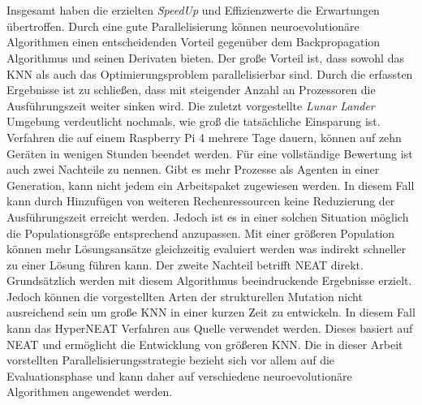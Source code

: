 \\\\
Insgesamt haben die erzielten \emph{SpeedUp} und Effizienzwerte die Erwartungen übertroffen. Durch eine gute Parallelisierung können neuroevolutionäre Algorithmen einen entscheidenden Vorteil gegenüber dem Backpropagation Algorithmus und seinen Derivaten bieten. Der große Vorteil ist, dass sowohl das \ac{KNN} als auch das Optimierungsproblem parallelisierbar sind. Durch die erfassten Ergebnisse ist zu schließen, dass mit steigender Anzahl an Prozessoren die Ausführungszeit weiter sinken wird. Die zuletzt vorgestellte \emph{Lunar Lander} Umgebung verdeutlicht nochmals, wie groß die tatsächliche Einsparung ist. Verfahren die auf einem Raspberry Pi 4 mehrere Tage dauern, können auf zehn Geräten in wenigen Stunden beendet werden. Für eine vollständige Bewertung ist auch zwei Nachteile zu nennen. Gibt es mehr Prozesse als Agenten in einer Generation, kann nicht jedem ein Arbeitspaket zugewiesen werden. In diesem Fall kann durch Hinzufügen von weiteren Rechenressourcen keine Reduzierung der Ausführungszeit erreicht werden. Jedoch ist es in einer solchen Situation möglich die Populationsgröße entsprechend anzupassen. Mit einer größeren Population können mehr Lösungsansätze gleichzeitig evaluiert werden was indirekt schneller zu einer Lösung führen kann. Der zweite Nachteil betrifft \ac{NEAT} direkt. Grundsätzlich werden mit diesem Algorithmus beeindruckende Ergebnisse erzielt. Jedoch können die vorgestellten Arten der strukturellen Mutation nicht ausreichend sein um große \ac{KNN} in einer kurzen Zeit zu entwickeln. In diesem Fall kann das HyperNEAT Verfahren aus Quelle \cite{stanley2009hyperneat} verwendet werden. Dieses basiert auf \ac{NEAT} und ermöglicht die Entwicklung von größeren \ac{KNN}. Die in dieser Arbeit vorstellten Parallelisierungsstrategie bezieht sich vor allem auf die Evaluationsphase und kann daher auf verschiedene neuroevolutionäre Algorithmen angewendet werden.

